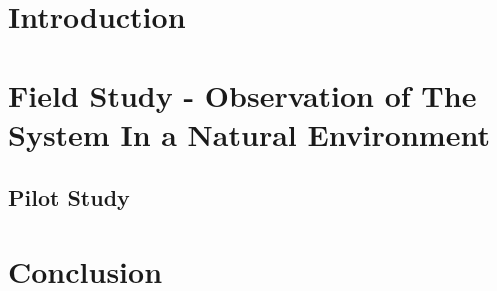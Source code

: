 \section{Introduction}

\section{Field Study - Observation of The System In a Natural Environment}
\subsection{Pilot Study}
\section{Conclusion}
